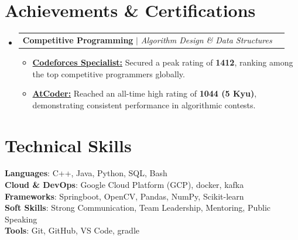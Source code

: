 \documentclass[letterpaper,11pt]{article}
\makeatletter
\newcommand{\resumeItem}[1]{
    \item\small{
      {#1 \vspace{-2pt}}
    }
  }
\newcommand{\resumeProjectHeading}[2]{
      \item
      \begin{tabular*}{0.97\textwidth}{l@{\extracolsep{\fill}}r}
        \small#1 & #2 \\
      \end{tabular*}\vspace{-7pt}
  }
\newcommand{\resumeSubHeadingListStart}{\begin{itemize}[leftmargin=0.15in, label={}]}
\newcommand{\resumeSubHeadingListEnd}{\end{itemize}}
\newcommand{\resumeItemListStart}{\begin{itemize}}
\newcommand{\resumeItemListEnd}{\end{itemize}\vspace{-5pt}}
\makeatother
\begin{document}


      
  \section{Achievements \& Certifications}
    \resumeSubHeadingListStart

      \resumeProjectHeading
        {\textbf{Competitive Programming} $|$ \emph{Algorithm Design \& Data Structures}}{}
        \resumeItemListStart
          \resumeItem{\href{https://codeforces.com/profile/Raj-12}{\textbf{Codeforces Specialist:}} Secured a peak rating of \textbf{1412}, ranking among the top competitive programmers globally.}

          \resumeItem{\href{https://atcoder.jp/users/deep_2012}{\textbf{AtCoder:}} Reached an all-time high rating of \textbf{1044 (5 Kyu)}, demonstrating consistent performance in algorithmic contests.}

        \resumeItemListEnd

    \resumeSubHeadingListEnd

  \section{Technical Skills}
  \begin{itemize}[leftmargin=0.15in, label={}]
      \small{\item{
      \textbf{Languages}{: C++, Java, Python, SQL, Bash} \\
      \textbf{Cloud \& DevOps}{: Google Cloud Platform (GCP), docker, kafka} \\
      \textbf{Frameworks}{: Springboot, OpenCV, Pandas, NumPy, Scikit-learn} \\
      \textbf{Soft Skills}{: Strong Communication, Team Leadership, Mentoring, Public Speaking} \\
      \textbf{Tools}{: Git, GitHub, VS Code, gradle}
      }}
  \end{itemize}

  
\end{document}
